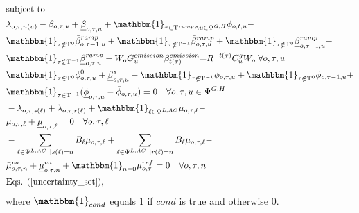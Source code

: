 \documentclass[final]{IEEEtran}
\newcommand{\Tau}{\mathrm{T}}
\begin{document}
\begin{align}
&\text{subject to} \nonumber \\
&\lambda_{o, \tau, n(u)} - \bar{\beta}_{o, \tau, u} + \underline{\beta}_{o, \tau, u} + \mathbbm{1}_{\tau \in \Tau^{ramp} \land u \in \Psi^{G, H}} \phi_{o, t, u} - \nonumber \\
&\mathbbm{1}_{\tau \notin \Tau^0} \bar{\beta}_{o, \tau - 1, u}^{ramp} + \mathbbm{1}_{\tau \notin \Tau^{-1}} \bar{\beta}_{o, \tau, u}^{ramp} + \mathbbm{1}_{\tau \notin \Tau^0} \underline{\beta}_{o, \tau - 1, u}^{ramp} - \nonumber \\
&\label{sub_constr1}\mathbbm{1}_{\tau \notin \Tau^{-1}} \underline{\beta}_{o, \tau, u}^{ramp} - W_o G_{u}^{emission} \beta_{t(\tau)}^{emission} {=} R^{-t(\tau)} C^g_{u}  W_o \; \forall o, \tau, u \\
&\mathbbm{1}_{\tau \in \Tau^0} \phi_{o, \tau, u}^{0} + \underline{\beta}_{o, \tau, u}^s - \mathbbm{1}_{\tau \notin \Tau^{-1}} \phi_{o, \tau, u} + \mathbbm{1}_{\tau \notin \Tau^0} \phi_{o, \tau - 1, u} + \nonumber \\
&\mathbbm{1}_{\tau \in \Tau^{-1}} (\underline{\phi}_{o, \tau, u} - \bar{\phi}_{o, \tau, u}) = 0 \quad \forall o, \tau, u \in \Psi^{G, H} \\
&-\lambda_{o, \tau, s(\ell)} + \lambda_{o, \tau, r(\ell)} + \mathbbm{1}_{\ell \in \Psi^{L,AC}} \mu_{o, \tau, \ell} - \nonumber \\
&\bar{\mu}_{o, \tau, \ell} + \underline{\mu}_{o, \tau, \ell} = 0 \quad \forall o, \tau, \ell \\
&-\sum\limits_{\ell \in \Psi^{L,AC} | s(\ell) = n} B_\ell \mu_{o, \tau, \ell} + \sum\limits_{\ell \in \Psi^{L,AC} | r(\ell) = n} B_\ell \mu_{o, \tau, \ell} - \nonumber \\
&\bar{\mu}^{va}_{o, \tau, n} + \underline{\mu}^{va}_{o, \tau, n} + \mathbbm{1}_{n = 0} \mu^{ref}_{o, \tau} = 0 \quad \forall o, \tau, n \\
&\label{sub_last}\text{Eqs. } (\ref{uncertainty_set}),
\end{align}
where $\mathbbm{1}_{cond}$ equals 1 if $cond$ is true and otherwise 0.
\end{document}
